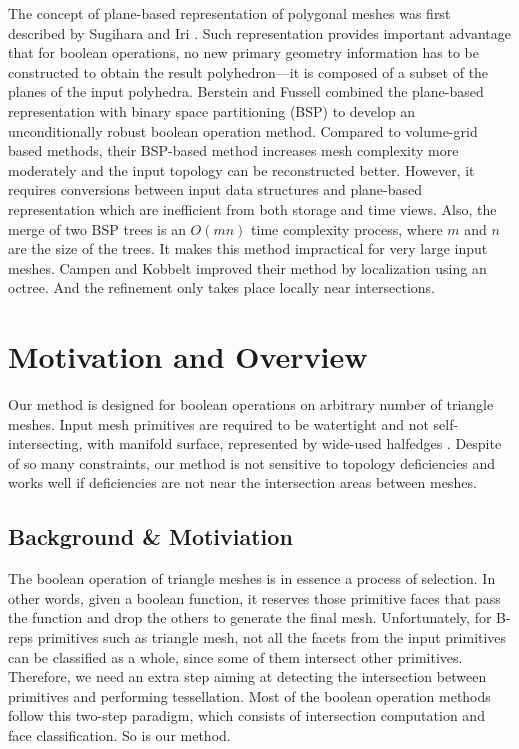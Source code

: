 \documentclass[10pt,journal,compsoc]{IEEEtran}
\begin{document}
The concept of plane-based representation of polygonal meshes was first described by Sugihara and Iri \cite{sugihara1990solid}. Such representation provides important advantage that for boolean operations, no new primary geometry information has to be constructed to obtain the result polyhedron---it is composed of a subset of the planes of the input polyhedra. Berstein and Fussell \cite{bernstein2009fast} combined the plane-based representation with binary space partitioning (BSP) \cite{thibault1987set,naylor1990merging} to develop an unconditionally robust boolean operation method. Compared to volume-grid based methods, their BSP-based method increases mesh complexity more moderately and the input topology can be reconstructed better. However, it requires conversions between input data structures and plane-based representation which are inefficient from both storage and time views. Also, the merge of two BSP trees is an $O(mn)$ time complexity process, where $m$ and $n$ are the size of the trees. It makes this method impractical for very large input meshes. Campen and Kobbelt \cite{campen2010exact} improved their method by localization using an octree. And the refinement only takes place locally near intersections.


\section{Motivation and Overview}

\label{sec:overview}
Our method is designed for boolean operations on arbitrary number of triangle meshes. Input mesh primitives are required to be watertight and not self-intersecting, with manifold surface, represented by wide-used halfedges \cite{mcguire2000half}. Despite of so many constraints, our method is not sensitive to topology deficiencies and works well if deficiencies are not near the intersection areas between meshes.


\subsection{Background \& Motiviation}
\label{sec:paradigm}

The boolean operation of triangle meshes is in essence a process of selection. In other words, given a boolean function, it reserves those primitive faces that pass the function and drop the others to generate the final mesh. Unfortunately, for B-reps primitives such as triangle mesh, not all the facets from the input primitives can be classified as a whole, since some of them intersect other primitives. Therefore, we need an extra step aiming at detecting the intersection between primitives and performing tessellation. Most of the boolean operation methods follow this two-step paradigm, which consists of intersection computation and face classification. So is our method.
\end{document}
